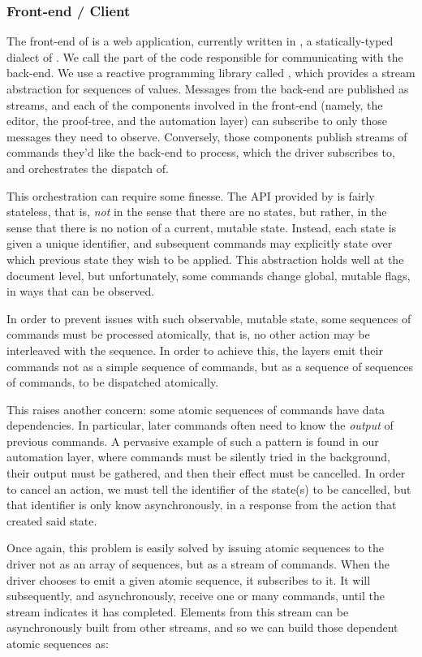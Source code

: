 \subsubsection*{Front-end / Client}

The front-end of \PeaCoq{} is a web application, currently written in
\TypeScript{}, a statically-typed dialect of \JavaScript{}.  We call
 the part of the code responsible for communicating with the
back-end.  We use a reactive programming library called \RxJS{}, which provides
a stream abstraction for sequences of values.  Messages from the back-end are
published as streams, and each of the components involved in the front-end
(namely, the editor, the proof-tree, and the automation layer) can subscribe to
only those messages they need to observe.  Conversely, those components publish
streams of commands they'd like the back-end to process, which the driver
subscribes to, and orchestrates the dispatch of.

This orchestration can require some finesse.  The API provided by \Coq{} is
fairly stateless, that is, \emph{not} in the sense that there are no states, but
rather, in the sense that there is no notion of a current, mutable state.
Instead, each state is given a unique identifier, and subsequent commands may
explicitly state over which previous state they wish to be applied.  This
abstraction holds well at the document level, but unfortunately, some commands
change global, mutable flags, in ways that can be observed.

In order to prevent issues with such observable, mutable state, some sequences
of commands must be processed atomically, that is, no other action may be
interleaved with the sequence.  In order to achieve this, the layers emit their
commands not as a simple sequence of commands, but as a sequence of sequences of
commands, to be dispatched atomically.

This raises another concern: some atomic sequences of commands have data
dependencies.  In particular, later commands often need to know the
\emph{output} of previous commands.  A pervasive example of such a pattern is
found in our automation layer, where commands must be silently tried in the
background, their output must be gathered, and then their effect must be
cancelled.  In order to cancel an action, we must tell \Coq{} the identifier of
the state(s) to be cancelled, but that identifier is only know asynchronously,
in a response from the action that created said state.

Once again, this problem is easily solved by issuing atomic sequences to the
driver not as an array of sequences, but as a stream of commands.  When the
driver chooses to emit a given atomic sequence, it subscribes to it.  It will
subsequently, and asynchronously, receive one or many commands, until the stream
indicates it has completed.  Elements from this stream can be asynchronously
built from other streams, and so we can build those dependent atomic sequences
as:

